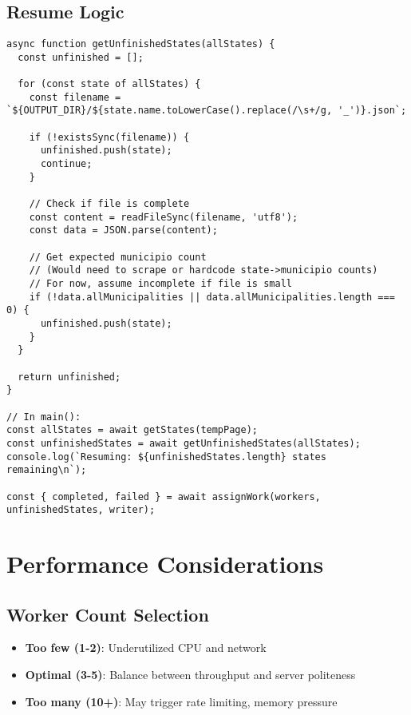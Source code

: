 \documentclass[11pt,a4paper]{article}
\begin{document}
\subsection{Resume Logic}

\begin{lstlisting}[caption={Smart Resume on Restart}]
async function getUnfinishedStates(allStates) {
  const unfinished = [];

  for (const state of allStates) {
    const filename = `${OUTPUT_DIR}/${state.name.toLowerCase().replace(/\s+/g, '_')}.json`;

    if (!existsSync(filename)) {
      unfinished.push(state);
      continue;
    }

    // Check if file is complete
    const content = readFileSync(filename, 'utf8');
    const data = JSON.parse(content);

    // Get expected municipio count
    // (Would need to scrape or hardcode state->municipio counts)
    // For now, assume incomplete if file is small
    if (!data.allMunicipalities || data.allMunicipalities.length === 0) {
      unfinished.push(state);
    }
  }

  return unfinished;
}

// In main():
const allStates = await getStates(tempPage);
const unfinishedStates = await getUnfinishedStates(allStates);
console.log(`Resuming: ${unfinishedStates.length} states remaining\n`);

const { completed, failed } = await assignWork(workers, unfinishedStates, writer);
\end{lstlisting}

\section{Performance Considerations}

\subsection{Worker Count Selection}

\begin{itemize}
    \item \textbf{Too few (1-2)}: Underutilized CPU and network
    \item \textbf{Optimal (3-5)}: Balance between throughput and server politeness
    \item \textbf{Too many (10+)}: May trigger rate limiting, memory pressure
\end{itemize}
\end{document}
